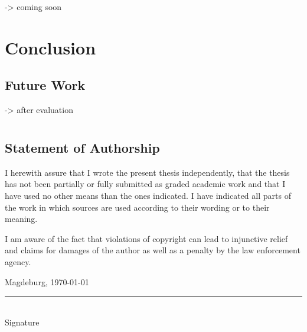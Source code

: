 \documentclass[
	12pt,
	a4paper,
	abstract,
	bibliography=totoc,
	chapterprefix,
	headings=openright,
	numbers=endperiod,
	parskip=half,
	twoside,
]{scrreprt}
\begin{document}
-> coming soon

\chapter{Conclusion}
\label{cha:conclusion}

\section{Future Work}

-> after evaluation








\appendix




\chapter*{}

\section*{Statement of Authorship}

I herewith assure that I wrote the present thesis independently, that the thesis has not been partially or fully submitted as graded academic work and that I have used no other means than the ones indicated.
I have indicated all parts of the work in which sources are used according to their wording or to their meaning.

I am aware of the fact that violations of copyright can lead to injunctive relief and claims for damages of the author as well as a penalty by the law enforcement agency.

\bigskip

Magdeburg, \today

\bigskip
\bigskip

\rule{0.5\textwidth}{0.5pt}\\
\hspace*{0.25em}Signature
\end{document}
